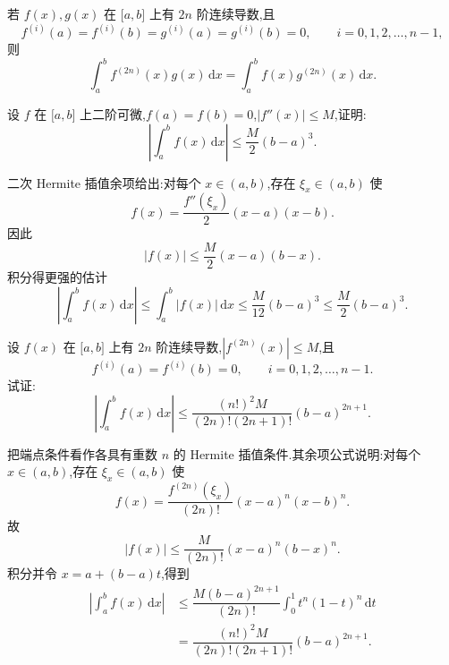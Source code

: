 
\begin{proposition}[\markstar]
    若 $f(x),g(x)$ 在 $\lbrack a,b\rbrack$ 上有 $2n$ 阶连续导数,且
    \[
        f^{(i)}(a)=f^{(i)}(b)=g^{(i)}(a)=g^{(i)}(b)=0,
        \qquad i=0,1,2,\ldots,n-1,
    \]
    则
    \[
        \displaystyle\int_a^bf^{(2n)}(x)g(x)\,\mathrm{d}x
        =\int_a^bf(x)g^{(2n)}(x)\,\mathrm{d}x.
    \]
\end{proposition}

\begin{example}
    设 $f$ 在 $\lbrack a,b\rbrack$ 上二阶可微,$f(a)=f(b)=0$,$|f''(x)|\leq M$,证明:
    \[
        \left|\int_a^bf(x)\,\mathrm{d}x\right|
        \leq\dfrac{M}{2}(b-a)^3.
    \]
\end{example}
\exampleblank

\begin{solution}
    二次 Hermite 插值余项给出:对每个 $x\in(a,b)$,存在 $\xi_x\in(a,b)$ 使
    \[
        f(x)=\dfrac{f''(\xi_x)}{2}(x-a)(x-b).
    \]
    因此
    \[
        |f(x)|\leq\dfrac{M}{2}(x-a)(b-x).
    \]
    积分得更强的估计
    \[
        \left|\int_a^bf(x)\,\mathrm{d}x\right|
        \leq\int_a^b|f(x)|\,\mathrm{d}x
        \leq\dfrac{M}{12}(b-a)^3
        \leq\dfrac{M}{2}(b-a)^3.
    \]
\end{solution}

\begin{example}
    设 $f(x)$ 在 $\lbrack a,b\rbrack$ 上有 $2n$ 阶连续导数,$|f^{(2n)}(x)|\leq M$,且
    \[
        f^{(i)}(a)=f^{(i)}(b)=0,
        \qquad i=0,1,2,\ldots,n-1.
    \]
    试证:
    \[
        \left|\int_a^bf(x)\,\mathrm{d}x\right|
        \leq\dfrac{(n!)^2M}{(2n)!(2n+1)!}(b-a)^{2n+1}.
    \]
\end{example}
\exampleblank

\begin{solution}
    把端点条件看作各具有重数 $n$ 的 Hermite 插值条件.其余项公式说明:对每个 $x\in(a,b)$,存在 $\xi_x\in(a,b)$ 使
    \[
        f(x)=\dfrac{f^{(2n)}(\xi_x)}{(2n)!}
        (x-a)^n(x-b)^n.
    \]
    故
    \[
        |f(x)|\leq\dfrac{M}{(2n)!}(x-a)^n(b-x)^n.
    \]
    积分并令 $x=a+(b-a)t$,得到
    \[
        \begin{aligned}
            \left|\int_a^bf(x)\,\mathrm{d}x\right|
             & \leq\dfrac{M(b-a)^{2n+1}}{(2n)!}
            \int_0^1t^n(1-t)^n\,\mathrm{d}t                \\
             & =\dfrac{(n!)^2M}{(2n)!(2n+1)!}(b-a)^{2n+1}.
        \end{aligned}
    \]
\end{solution}

